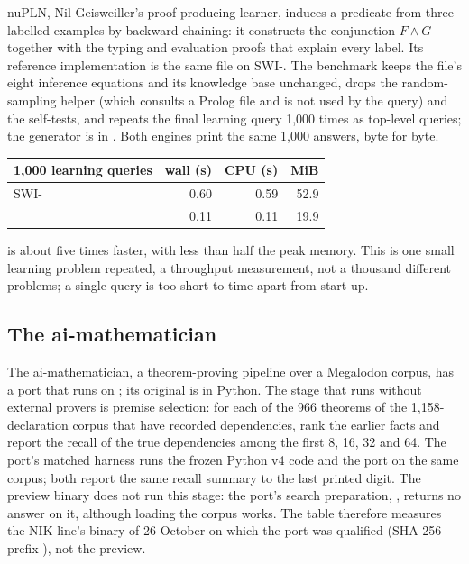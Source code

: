 nuPLN, Nil Geisweiller's proof-producing learner, induces a predicate from
three labelled examples by backward chaining: it constructs the conjunction
$F \wedge G$ together with the typing and evaluation proofs that explain
every label.  Its reference implementation is the same \PeTTa{} file on
SWI-\PeTTa{}.  The benchmark keeps the file's eight inference equations and
its knowledge base unchanged, drops the random-sampling helper (which consults
a Prolog file and is not used by the query) and the self-tests, and repeats the
final learning query 1,000 times as top-level queries; the generator is in
.  Both engines print the same 1,000 answers, byte for
byte.

\begin{center}
\small
\begin{tabular}{@{}lrrr@{}}
\toprule
1,000 learning queries & wall (s) & CPU (s) & MiB \\
\midrule
SWI-\PeTTa{} & 0.60 & 0.59 & 52.9 \\
\CeTTa{} & 0.11 & 0.11 & 19.9 \\
\bottomrule
\end{tabular}
\end{center}

\CeTTa{} is about five times faster, with less than half the peak memory.
This is one small learning problem repeated, a throughput measurement, not a
thousand different problems; a single query is too short to time apart from
start-up.

\subsection{The ai-mathematician}
\label{app:runtimes-aimath}

The ai-mathematician, a theorem-proving pipeline over a Megalodon corpus,
has a \PeTTa{} port that runs on \CeTTa{}; its original is in Python.  The
stage that runs without external provers is premise selection: for each of the
966 theorems of the 1,158-declaration corpus that have recorded dependencies,
rank the earlier facts and report the recall of the true dependencies among the
first 8, 16, 32 and 64.  The port's matched harness runs the frozen Python v4
code and the port on the same corpus; both report the same recall summary to
the last printed digit.  The preview binary does not run this stage: the
port's search preparation, , returns no answer on
it, although loading the corpus works.  The table therefore measures the NIK
line's binary of 26 October on which the port was qualified (SHA-256 prefix
), not the preview.

